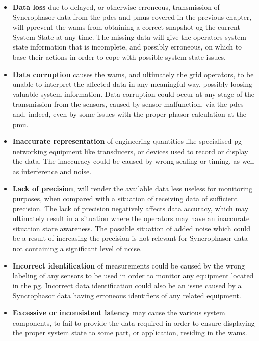 \begin{itemize}

    \item \textbf{Data loss} due to delayed, or otherwise erroneous, transmission of Syncrophasor data from the \acrshort{pdc}s and \acrshort{pmu}s covered in the previous chapter, will pprevent the \acrshort{wams} from obtaining a correct snapshot og the current System State at any time. The missing data will give the operators system state information that is incomplete, and possibly erroneous,  on which to base their actions in order to cope with possible system state issues.
    \item \textbf{Data corruption} causes the \acrshort{wams}, and ultimately the grid operators, to be unable to interpret the affected data in any meaningful way, possibly loosing valuable system information. Data corruption could occur at any stage of the transmission from the sensors, caused by sensor malfunction, via the \acrshort{pdc}s and, indeed, even by some issues with the proper phasor calculation at the \acrfull{pmu}.  
    \item \textbf{Inaccurate representation} of engineering quantities like specialised \acrshort{pg} networking equipment like transducers, or devices used to record or display the data. The inaccuracy could be caused by wrong scaling or timing, as well as interference and noise. 
    \item \textbf{Lack of precision}, will render the available data less useless for monitoring purposes, when compared with a situation of receiving data of sufficient precision. The lack of precision negatively affects data accuracy, which may ultimately result in a situation where the operators may have an inaccurate situation stare awareness. The possible situation of added noise which could be a result of increasing the precision is not relevant for Syncrophasor data not containing a significant level of noise.
    \item \textbf{Incorrect identification} of measurements could be caused by the wrong labeling of any sensors to be used in order to monitor any equipment located in the \acrshort{pg}. Incorrect data identification could also be an issue caused by a Syncrophasor data  having erroneous identifiers of any related equipment.
    \item \textbf{Excessive or inconsistent latency} may cause the various system components, to fail to provide the data required in order to ensure displaying the proper system state to some part, or application, residing in the \acrlong{wams}. 
\end{itemize}




